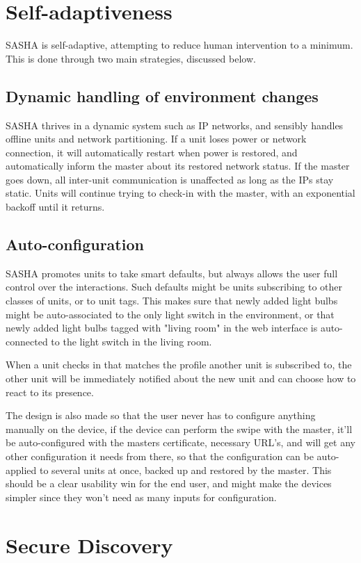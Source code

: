 \section{Self-adaptiveness}
SASHA is self-adaptive, attempting to reduce human intervention to a minimum. This is done through two main strategies, discussed below.

\subsection{Dynamic handling of environment changes}
SASHA thrives in a dynamic system such as IP networks, and sensibly handles offline units and network partitioning. If a unit loses power or network connection, it will automatically restart when power is restored, and automatically inform the master about its restored network status. If the master goes down, all inter-unit communication is unaffected as long as the IPs stay static. Units will continue trying to check-in with the master, with an exponential backoff until it returns.

\subsection{Auto-configuration}
SASHA promotes units to take smart defaults, but always allows the user full control over the interactions. Such defaults might be units subscribing to other classes of units, or to unit tags. This makes sure that newly added light bulbs might be auto-associated to the only light switch in the environment, or that newly added light bulbs tagged with "living room" in the web interface is auto-connected to the light switch in the living room.

When a unit checks in that matches the profile another unit is subscribed to, the other unit will be immediately notified about the new unit and can choose how to react to its presence.

The design is also made so that the user never has to configure anything manually on the device, if the device can perform the swipe with the master, it'll be auto-configured with the masters certificate, necessary URL’s, and will get any other configuration it needs from there, so that the configuration can be auto-applied to several units at once, backed up and restored by the master. This should be a clear usability win for the end user, and might make the devices simpler since they won't need as many inputs for configuration.

\section{Secure Discovery}
